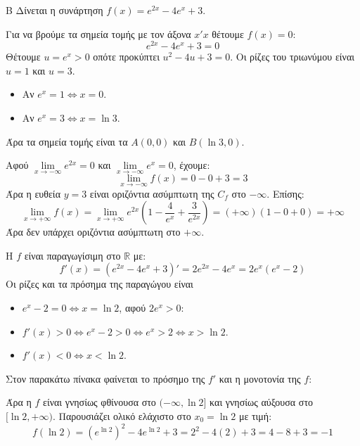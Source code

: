 \begin{thema}{Β}
Δίνεται η συνάρτηση $f(x) = e^{2x} - 4e^x + 3$.

\begin{erwthma}
\item Για να βρούμε τα σημεία τομής με τον άξονα $x'x$ θέτουμε $f(x) = 0$:
\[ e^{2x} - 4e^x + 3 = 0 \]
Θέτουμε $u = e^x > 0$ οπότε προκύπτει $u^2 - 4u + 3 = 0$. Οι ρίζες του τριωνύμου είναι $u=1$ και $u=3$.
\begin{itemize}
\item Αν $e^x = 1 \Leftrightarrow x = 0$.
\item Αν $e^x = 3 \Leftrightarrow x = \ln 3$.
\end{itemize}
Άρα τα σημεία τομής είναι τα $A(0, 0)$ και $B(\ln 3, 0)$.
\item Αφού $\lim\limits_{x\to-\infty} e^{2x} = 0$ και $\lim\limits_{x\to-\infty} e^x = 0$, έχουμε:
\[ \lim_{x\to-\infty} f(x) = 0 - 0 + 3 = 3 \]
Άρα η ευθεία $y = 3$ είναι οριζόντια ασύμπτωτη της $C_f$ στο $-\infty$.
Επίσης:
\[ \lim_{x\to+\infty} f(x) = \lim_{x\to+\infty} e^{2x}\left(1 - \frac{4}{e^x} + \frac{3}{e^{2x}}\right) = (+\infty)(1 - 0 + 0) = +\infty \]
Άρα δεν υπάρχει οριζόντια ασύμπτωτη στο $+\infty$.

\item Η $f$ είναι παραγωγίσιμη στο $\mathbb{R}$ με:
\[ f'(x)=\left(e^{2x}-4e^x+3\right)' = 2e^{2x} - 4e^x = 2e^x(e^x - 2) \]
Οι ρίζες και τα πρόσημα της παραγώγου είναι 
\begin{itemize}
\item $e^x - 2 = 0 \Leftrightarrow x = \ln 2$, αφού $2e^x > 0$:
\item $f'(x) > 0 \Leftrightarrow e^x - 2 > 0 \Leftrightarrow e^x > 2 \Leftrightarrow x > \ln 2$.
\item $f'(x) < 0 \Leftrightarrow x < \ln 2$.
\end{itemize}

Στον παρακάτω πίνακα φαίνεται το πρόσημο της $f'$ και η μονοτονία της $f$:
\begin{center}
\end{center}
Άρα η $f$ είναι γνησίως φθίνουσα στο $(-\infty, \ln 2]$ και γνησίως αύξουσα στο $[\ln 2, +\infty)$.
Παρουσιάζει ολικό ελάχιστο στο $x_0 = \ln 2$ με τιμή:
\[ f(\ln 2) = (e^{\ln 2})^2 - 4e^{\ln 2} + 3 = 2^2 - 4(2) + 3 = 4 - 8 + 3 = -1 \]


\end{erwthma}
\end{thema}
